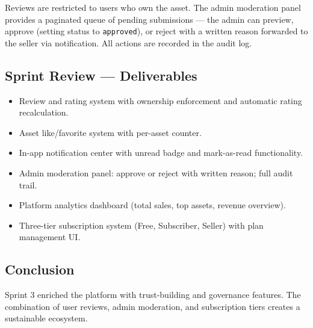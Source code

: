 Reviews are restricted to users who own the asset. The admin moderation panel provides a paginated queue of pending submissions — the admin can preview, approve (setting status to \texttt{approved}), or reject with a written reason forwarded to the seller via notification. All actions are recorded in the audit log.

\subsection{Sprint Review --- Deliverables}

\begin{itemize}
  \item Review and rating system with ownership enforcement and automatic rating recalculation.
  \item Asset like/favorite system with per-asset counter.
  \item In-app notification center with unread badge and mark-as-read functionality.
  \item Admin moderation panel: approve or reject with written reason; full audit trail.
  \item Platform analytics dashboard (total sales, top assets, revenue overview).
  \item Three-tier subscription system (Free, Subscriber, Seller) with plan management UI.
\end{itemize}

\subsection*{Conclusion}
Sprint 3 enriched the platform with trust-building and governance features. The combination of user reviews, admin moderation, and subscription tiers creates a sustainable ecosystem.
